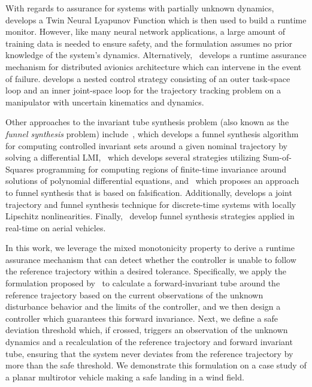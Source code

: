 \documentclass[preprint,12pt]{elsarticle}
\begin{document}
With regards to assurance for systems with partially unknown dynamics,~\cite{XiongNeural} develops a Twin Neural Lyapunov Function which is then used to build a runtime monitor. However, like many neural network applications, a large amount of training data is needed to ensure safety, and the formulation assumes no prior knowledge of the system's dynamics. Alternatively,~\cite{ghoriDist} develops a runtime assurance mechanism for distributed avionics architecture which can intervene in the event of failure. \cite{tarokhManip} develops a nested control strategy consisting of an outer task-space loop and an inner joint-space loop for the trajectory tracking problem on a manipulator with uncertain kinematics and dynamics.

Other approaches to the invariant tube synthesis problem (also known as the \emph{funnel synthesis} problem) include~\cite{BehcetFunnel}, which develops a funnel synthesis algorithm for computing controlled invariant sets around a given nominal trajectory by solving a differential LMI,~\cite{TOBENKINSoS} which develops several strategies utilizing Sum-of-Squares programming for computing regions of finite-time invariance around solutions of polynomial differential equations, and~\cite{FejlekFalsifier} which proposes an approach to funnel synthesis that is based on falsification. Additionally, \cite{kim2023joint} develops a joint trajectory and funnel synthesis technique for discrete-time systems with locally Lipschitz nonlinearities. Finally,~\cite{Reynolds6DOF, MajumdarRealTime} develop funnel synthesis strategies applied in real-time on aerial vehicles.

\cite{sivaramStochasticReach}

In this work, we leverage the mixed monotonicity property to derive a runtime assurance mechanism that can detect whether the controller is unable to follow the reference trajectory within a desired tolerance. Specifically, we apply the formulation proposed by~\cite{GirardAbstraction} to calculate a forward-invariant tube around the reference trajectory based on the current observations of the unknown disturbance behavior and the limits of the controller, and we then design a controller which guarantees this forward invariance. Next, we define a safe deviation threshold which, if crossed, triggers an observation of the unknown dynamics and a recalculation of the reference trajectory and forward invariant tube, ensuring that the system never deviates from the reference trajectory by more than the safe threshold. We demonstrate this formulation on a case study of a planar multirotor vehicle making a safe landing in a wind field.
\end{document}
